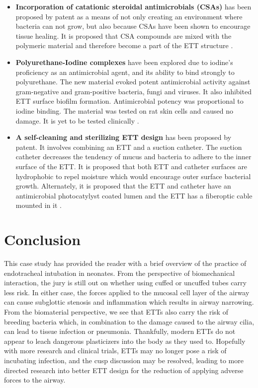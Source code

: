 \documentclass[12pt, openany, oneside]{book}
\begin{document}
\begin{itemize}
\item{{\bf{Incorporation of catationic steroidal antimicrobials (CSAs)}} has been proposed by patent as a means of not only creating an environment where bacteria can not grow, but also because CSAs have been shown to encourage tissue healing. It is proposed that CSA compounds are mixed with the polymeric material and therefore become a part of the ETT structure \citep{genberg2017novel}}.
\item{{\bf{Polyurethane-Iodine complexes}} have been explored due to iodine's proficiency as an antimicrobial agent, and its ability to bind strongly to polyurethane. The new material evoked potent antimicrobial activity against gram-negative and gram-positive bacteria, fungi and viruses. It also inhibited ETT surface biofilm formation. Antimicrobial potency was proportional to iodine binding. The material was tested on rat skin cells and caused no damage. It is yet to be tested clinically \citep{luo2010antimicrobial}.}
\item{{\bf{A self-cleaning and sterilizing ETT design}} has been proposed by patent. It involves combining an ETT and a suction catheter. The suction catheter decreases the tendency of mucus and bacteria to adhere to the inner surface of the ETT. It is proposed that both ETT and catheter surfaces are hydrophobic to repel moisture which would encourage outer surface bacterial growth. Alternately, it is proposed that the ETT and catheter have an antimicrobial photocatylyst coated lumen and the ETT has a fiberoptic cable mounted in it \citep{rao2013self}.}

\end{itemize}


\section{Conclusion}
This case study has provided the reader with a brief overview of the practice of endotracheal intubation in neonates. From the perspective of biomechanical interaction, the jury is still out on whether using cuffed or uncuffed tubes carry less risk. In either case, the forces applied to the mucosal cell layer of the airway can cause subglottic stenosis and inflammation which results in airway narrowing. From the biomaterial perspective, we see that ETTs also carry the risk of breeding bacteria which, in combination to the damage caused to the airway cilia, can lead to tissue infection or pneumonia. Thankfully, modern ETTs do not appear to leach dangerous plasticizers into the body as they used to. Hopefully with more research and clinical trials, ETTs may no longer pose a risk of incubating infection, and the cusp discussion may be resolved, leading to more directed research into better ETT design for the reduction of applying adverse forces to the airway. 
\end{document}
